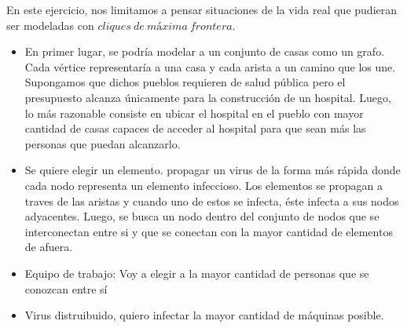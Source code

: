 En este ejercicio, nos limitamos a pensar situaciones de la vida real que pudieran ser modeladas con $cliques\ de\ máxima\ frontera$.
\begin{itemize}
\item En primer lugar, se podría modelar a un conjunto de casas como un grafo. Cada vértice representaría a una casa y cada arista a un camino que los une. Supongamos que dichos pueblos requieren de salud pública pero el presupuesto alcanza únicamente para la construcción de un hospital. Luego, lo más razonable consiste en ubicar el hospital en el pueblo con mayor cantidad de casas capaces de acceder al hospital para que sean más las personas que puedan alcanzarlo.


\item Se quiere elegir un elemento. propagar un virus de la forma más rápida donde cada nodo representa un elemento infeccioso. Los elementos se propagan a traves de las aristas y cuando uno de estos se infecta, éste infecta a sus nodos adyacentes. Luego, se busca un nodo dentro del conjunto de nodos que se interconectan entre si y que se conectan con la mayor cantidad de elementos de afuera. 

\item Equipo de trabajo: Voy a elegir a la mayor cantidad de personas que se conozcan entre sí  

\item Virus distruibuido, quiero infectar la mayor cantidad de máquinas posible.
 
\end{itemize}
